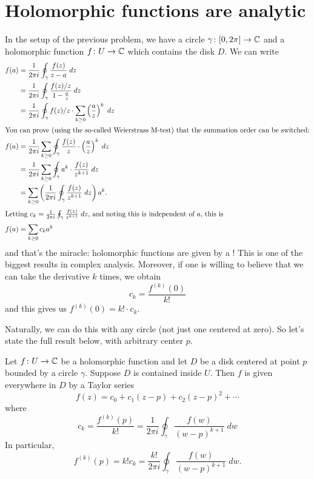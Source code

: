 \section{Holomorphic functions are analytic}
In the setup of the previous problem, we have a circle $\gamma \colon [0,2\pi] \to \mathbb C$
and a holomorphic function $f \colon U \to \mathbb C$ which contains the disk $D$.
We can write
\begin{align*}
	f(a) &= \frac{1}{2\pi i} \oint_\gamma \frac{f(z)}{z-a} \; dz \\
	&= \frac{1}{2\pi i} \oint_\gamma \frac{f(z)/z}{1 - \frac az} \; dz \\
	&= \frac{1}{2\pi i} \oint_\gamma f(z)/z \cdot \sum_{k \ge 0} \left( \frac az \right)^k \; dz \\
	\intertext{You can prove (using the so-called Weierstrass M-test) that the summation order can be switched:}
	f(a) &= \frac{1}{2\pi i} \sum_{k \ge 0} \oint_\gamma \frac{f(z)}{z} \cdot \left( \frac az \right)^k \; dz \\
	&= \frac{1}{2\pi i} \sum_{k \ge 0} \oint_\gamma a^k \cdot \frac{f(z)}{z^{k+1}} \; dz \\
	&=  \sum_{k \ge 0} \left( \frac{1}{2\pi i}\oint_\gamma \frac{f(z)}{z^{k+1}} \; dz \right) a^k. \\
	\intertext{Letting
		$c_k =  \frac{1}{2\pi i}\oint_\gamma \frac{f(z)}{z^{k+1}} \; dz$,
		and noting this is independent of $a$, this is}
	f(a) &= \sum_{k \ge 0} c_k a^k
\end{align*}
and that's the miracle: holomorphic functions
are given by a !
This is one of the biggest results in complex analysis.
Moreover, if one is willing to believe that we can
take the derivative $k$ times, we obtain
\[ c_k = \frac{f^{(k)}(0)}{k!} \]
and this gives us $f^{(k)}(0) = k! \cdot c_k$.

Naturally, we can do this with any circle (not just one centered at zero).
So let's state the full result below, with arbitrary center $p$.

\begin{theorem}
	Let $f \colon U \to \mathbb C$ be a holomorphic function and let $D$ be a disk centered at point $p$
	bounded by a circle $\gamma$.  Suppose $D$ is contained inside $U$.
	Then $f$ is given everywhere in $D$ by a Taylor series
	\[
		f(z) = c_0 + c_1(z-p) + c_2(z-p)^2 + \cdots
	\]
	where
	\[
		c_k = \frac{f^{(k)}(p)}{k!} = \frac{1}{2\pi i} \oint_\gamma \frac{f(w)}{(w-p)^{k+1}} \; dw
	\]
	In particular,
	\[ f^{(k)}(p) = k! c_k = \frac{k!}{2\pi i} \oint_\gamma \frac{f(w)}{(w-p)^{k+1}} \; dw. \]
\end{theorem}

